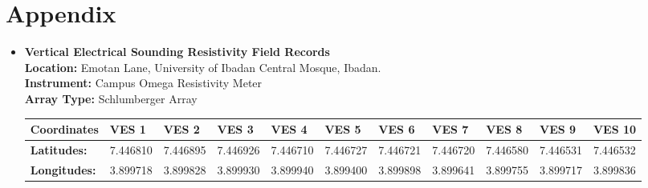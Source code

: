 \documentclass[12pt,a4paper]{report}
\begin{document}
\chapter*{Appendix}

\begin{itemize}
    \item \textbf{Vertical Electrical Sounding Resistivity Field Records} \\

    \textbf{Location:} {Emotan Lane, University of Ibadan Central Mosque, Ibadan.} \\
    \textbf{Instrument:} {Campus Omega Resistivity Meter} \\
    \textbf{Array Type:} {Schlumberger Array }

    \begin{table}[H]
        \centering
        \begin{adjustbox}{max width=\textwidth}
        \renewcommand{\arraystretch}{1.5}
        \begin{tabular}{|p{2.5cm}|p{1.5cm}|p{1.8cm}|p{1.5cm}|p{1.8cm}|p{1.5cm}|p{1.8cm}|p{1.5cm}|p{1.8cm}|p{1.5cm}|p{1.8cm}|}
        \hline
        \textbf{Coordinates} &  
        \textbf{VES 1} & 
        \textbf{VES 2} & 
        \textbf{VES 3} & 
        \textbf{VES 4} & 
        \textbf{VES 5} & 
        \textbf{VES 6} & 
        \textbf{VES 7} & 
        \textbf{VES 8} & 
        \textbf{VES 9} & 
        \textbf{VES 10} \\ 
        \hline
        \textbf{Latitudes:} & 7.446810 & 7.446895 & 7.446926 & 7.446710 & 7.446727 & 7.446721 & 7.446720 & 7.446580 & 7.446531 & 7.446532 \\ \hline
        \textbf{Longitudes:} & 3.899718 & 3.899828 & 3.899930 & 3.899940 & 3.899400 & 3.899898 & 3.899641 & 3.899755 & 3.899717 & 3.899836 \\ \hline
        \end{tabular}
        \end{adjustbox}
        \label{tab:UI Mosque VES Coordinates: 1-0}
    \end{table}


\end{itemize}
\end{document}
